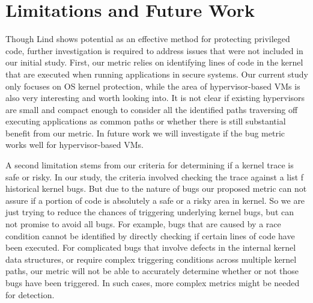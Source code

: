 \section{Limitations and Future Work}
\label{sec.limitation}

Though Lind shows potential as an effective method for protecting privileged code,
further investigation is required to address issues that were not included in our
initial study.
First, our metric relies on identifying lines of code in the kernel that are
executed when running applications in secure systems.
Our current study only focuses on OS kernel protection, while the area of hypervisor-based
VMs is also very interesting and worth looking into.
It is not clear if
existing hypervisors are small and compact enough to consider all the
identified paths traversing off executing applications as common paths or
whether there is still substantial benefit from our metric.
In %
future work we will %
investigate if the bug metric works well for %
hypervisor-based VMs.

A second limitation stems from our criteria for determining if a kernel trace is
safe or risky. In our study, the criteria involved checking the trace against a list
 f historical kernel bugs.
But due to the nature of bugs our proposed metric can not assure if a portion of code
is absolutely a safe or a risky area in kernel.
So we are just trying to reduce the chances of triggering underlying kernel bugs, but can 
not promise to avoid all bugs.
For example, bugs that are caused
by a race condition cannot be identified by directly checking if certain lines of
code have been executed. For complicated bugs that involve defects in the internal
kernel data structures, or require complex triggering conditions across multiple
kernel paths, our metric will not be able to accurately determine whether or not
those bugs have been triggered. In such cases, more complex metrics might be needed
 for detection.




